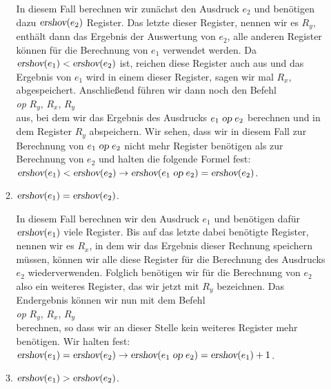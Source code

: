 \begin{enumerate}
\begin{enumerate}
            In diesem Fall berechnen wir zun\"achst den Ausdruck $e_2$ und ben\"otigen dazu
            $\textsl{ershov}(e_2)$ Register.  Das letzte dieser Register, nennen wir es
            $R_y$,             enth\"alt dann das Ergebnis
            der Auswertung von $e_2$, alle anderen Register k\"onnen f\"ur die Berechnung von $e_1$
            verwendet werden.  Da $\textsl{ershov}(e_1) < \textsl{ershov}(e_2)$ ist, reichen diese
            Register auch aus und das Ergebnis von $e_1$ wird in einem dieser Register, sagen
            wir mal $R_x$, abgespeichert.  Anschlie{\ss}end f\"uhren wir dann noch den Befehl
            \\[0.2cm]
            \hspace*{1.3cm}
            \textsl{op} $R_y$, $R_x$, $R_y$ 
            \\[0.2cm]
            aus, bei dem wir das Ergebnis des Ausdrucks $e_1 \;\textsl{op}\; e_2$ berechnen und in
            dem Register $R_y$ abspeichern.  Wir sehen, dass wir in diesem Fall zur Berechnung
            von $e_1 \;\textsl{op}\; e_2$ nicht mehr Register ben\"otigen als zur Berechnung von $e_2$
            und halten die folgende Formel fest:
            \\[0.2cm]
            \hspace*{1.3cm}
            $\textsl{ershov}(e_1) < \textsl{ershov}(e_2) \rightarrow 
             \textsl{ershov}(e_1 \;\textsl{op}\; e_2) = \textsl{ershov}(e_2)$.
      \item $\textsl{ershov}(e_1) = \textsl{ershov}(e_2)$.

            In diesem Fall berechnen wir den Ausdruck $e_1$ und ben\"otigen daf\"ur
            $\textsl{ershov}(e_1)$ viele Register.  Bis auf das letzte dabei ben\"otigte Register, 
            nennen wir es $R_x$, in dem wir das Ergebnis dieser Rechnung speichern m\"ussen, k\"onnen
            wir alle diese Register f\"ur die Berechnung des Ausdrucks $e_2$ wiederverwenden.
            Folglich ben\"otigen wir f\"ur die Berechnung von $e_2$ also ein weiteres Register, das wir
            jetzt mit $R_y$ bezeichnen.  Das Endergebnis k\"onnen wir nun mit dem Befehl
            \\[0.2cm]
            \hspace*{1.3cm}
            \textsl{op} $R_y$, $R_x$, $R_y$ 
            \\[0.2cm]
            berechnen, so dass wir an dieser Stelle kein weiteres Register mehr ben\"otigen.
            Wir halten fest:
            \\[0.2cm]
            \hspace*{1.3cm}
            $\textsl{ershov}(e_1) = \textsl{ershov}(e_2) \rightarrow 
             \textsl{ershov}(e_1 \;\textsl{op}\; e_2) = \textsl{ershov}(e_1) + 1$.
      \item $\textsl{ershov}(e_1) > \textsl{ershov}(e_2)$.


\end{enumerate}
\end{enumerate}
